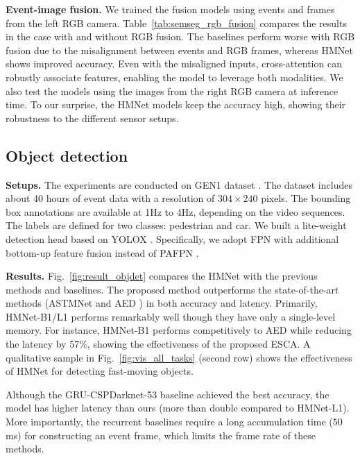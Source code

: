 \vspace{0.1cm}
\noindent
\textbf{Event-image fusion.}
We trained the fusion models using events and frames from the left RGB camera. Table~\ref{tab:semseg_rgb_fusion} compares the results in the case with and without RGB fusion.
The baselines perform worse with RGB fusion due to the misalignment between events and RGB frames, whereas HMNet shows improved accuracy.
Even with the misaligned inputs, cross-attention can robustly associate features, enabling the model to leverage both modalities.
We also test the models using the images from the right RGB camera at inference time.
To our surprise, the HMNet models keep the accuracy high, showing their robustness to the different sensor setups.

\subsection{Object detection}
\label{sec:object_detection}

\noindent
\textbf{Setups.}
The experiments are conducted on GEN1 dataset \cite{Perot2020}.
The dataset includes about 40 hours of event data with a resolution of $304\times 240$ pixels. The bounding box annotations are available at 1Hz to 4Hz, depending on the video sequences. The labels are defined for two classes: pedestrian and car.
We built a lite-weight detection head based on YOLOX \cite{Ge2021}. Specifically, we adopt FPN \cite{Lin2017} with additional bottom-up feature fusion instead of PAFPN \cite{Ge2021}.

\vspace{0.1cm}
\noindent
\textbf{Results.}
Fig.~\ref{fig:result_objdet} compares the HMNet with the previous methods and baselines. The proposed method outperforms the state-of-the-art methods (ASTMNet \cite{Li2022} and AED \cite{Liu2022}) in both accuracy and latency.
Primarily, HMNet-B1/L1 performs remarkably well though they have only a single-level memory. For instance, HMNet-B1 performs competitively to AED \cite{Liu2022} while reducing the latency by 57\%, showing the effectiveness of the proposed ESCA. A qualitative sample in Fig.~\ref{fig:vis_all_tasks} (second row) shows the effectiveness of HMNet for detecting fast-moving objects.

Although the GRU-CSPDarknet-53 baseline achieved the best accuracy, the model has higher latency than ours (more than double compared to HMNet-L1).
More importantly, the recurrent baselines require a long accumulation time (\eg $50$ms) for constructing an event frame, which limits the frame rate of these methods.

